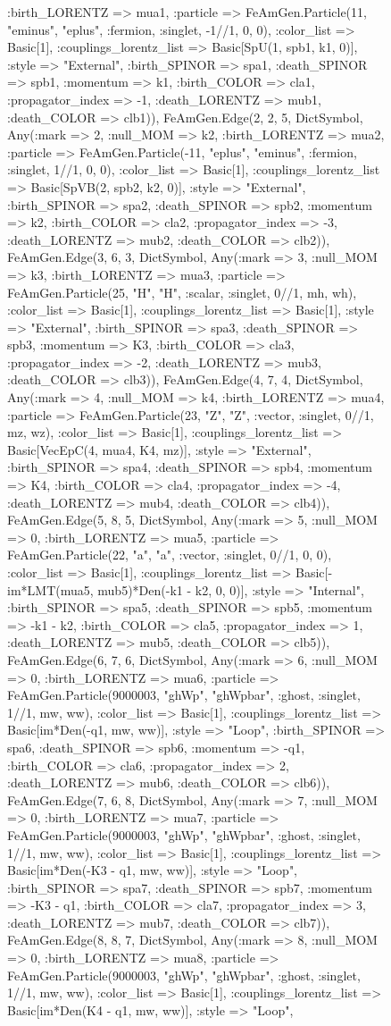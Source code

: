 \documentclass{revtex4}
\begin{document}
\begin{figure}[!htb]
\begin{center}
{:birth_LORENTZ => mua1, :particle => FeAmGen.Particle(11, "eminus", "eplus", :fermion, :singlet, -1//1, 0, 0), :color_list => Basic[1], :couplings_lorentz_list => Basic[SpU(1, spb1, k1, 0)], :style => "External", :birth_SPINOR => spa1, :death_SPINOR => spb1, :momentum => k1, :birth_COLOR => cla1, :propagator_index => -1, :death_LORENTZ => mub1, :death_COLOR => clb1)), FeAmGen.Edge(2, 2, 5, Dict{Symbol, Any}(:mark => 2, :null_MOM => k2, :birth_LORENTZ => mua2, :particle => FeAmGen.Particle(-11, "eplus", "eminus", :fermion, :singlet, 1//1, 0, 0), :color_list => Basic[1], :couplings_lorentz_list => Basic[SpVB(2, spb2, k2, 0)], :style => "External", :birth_SPINOR => spa2, :death_SPINOR => spb2, :momentum => k2, :birth_COLOR => cla2, :propagator_index => -3, :death_LORENTZ => mub2, :death_COLOR => clb2)), FeAmGen.Edge(3, 6, 3, Dict{Symbol, Any}(:mark => 3, :null_MOM => k3, :birth_LORENTZ => mua3, :particle => FeAmGen.Particle(25, "H", "H", :scalar, :singlet, 0//1, mh, wh), :color_list => Basic[1], :couplings_lorentz_list => Basic[1], :style => "External", :birth_SPINOR => spa3, :death_SPINOR => spb3, :momentum => K3, :birth_COLOR => cla3, :propagator_index => -2, :death_LORENTZ => mub3, :death_COLOR => clb3)), FeAmGen.Edge(4, 7, 4, Dict{Symbol, Any}(:mark => 4, :null_MOM => k4, :birth_LORENTZ => mua4, :particle => FeAmGen.Particle(23, "Z", "Z", :vector, :singlet, 0//1, mz, wz), :color_list => Basic[1], :couplings_lorentz_list => Basic[VecEpC(4, mua4, K4, mz)], :style => "External", :birth_SPINOR => spa4, :death_SPINOR => spb4, :momentum => K4, :birth_COLOR => cla4, :propagator_index => -4, :death_LORENTZ => mub4, :death_COLOR => clb4)), FeAmGen.Edge(5, 8, 5, Dict{Symbol, Any}(:mark => 5, :null_MOM => 0, :birth_LORENTZ => mua5, :particle => FeAmGen.Particle(22, "a", "a", :vector, :singlet, 0//1, 0, 0), :color_list => Basic[1], :couplings_lorentz_list => Basic[-im*LMT(mua5, mub5)*Den(-k1 - k2, 0, 0)], :style => "Internal", :birth_SPINOR => spa5, :death_SPINOR => spb5, :momentum => -k1 - k2, :birth_COLOR => cla5, :propagator_index => 1, :death_LORENTZ => mub5, :death_COLOR => clb5)), FeAmGen.Edge(6, 7, 6, Dict{Symbol, Any}(:mark => 6, :null_MOM => 0, :birth_LORENTZ => mua6, :particle => FeAmGen.Particle(9000003, "ghWp", "ghWpbar", :ghost, :singlet, 1//1, mw, ww), :color_list => Basic[1], :couplings_lorentz_list => Basic[im*Den(-q1, mw, ww)], :style => "Loop", :birth_SPINOR => spa6, :death_SPINOR => spb6, :momentum => -q1, :birth_COLOR => cla6, :propagator_index => 2, :death_LORENTZ => mub6, :death_COLOR => clb6)), FeAmGen.Edge(7, 6, 8, Dict{Symbol, Any}(:mark => 7, :null_MOM => 0, :birth_LORENTZ => mua7, :particle => FeAmGen.Particle(9000003, "ghWp", "ghWpbar", :ghost, :singlet, 1//1, mw, ww), :color_list => Basic[1], :couplings_lorentz_list => Basic[im*Den(-K3 - q1, mw, ww)], :style => "Loop", :birth_SPINOR => spa7, :death_SPINOR => spb7, :momentum => -K3 - q1, :birth_COLOR => cla7, :propagator_index => 3, :death_LORENTZ => mub7, :death_COLOR => clb7)), FeAmGen.Edge(8, 8, 7, Dict{Symbol, Any}(:mark => 8, :null_MOM => 0, :birth_LORENTZ => mua8, :particle => FeAmGen.Particle(9000003, "ghWp", "ghWpbar", :ghost, :singlet, 1//1, mw, ww), :color_list => Basic[1], :couplings_lorentz_list => Basic[im*Den(K4 - q1, mw, ww)], :style => "Loop", }
\end{center}
\end{figure}
\end{document}
